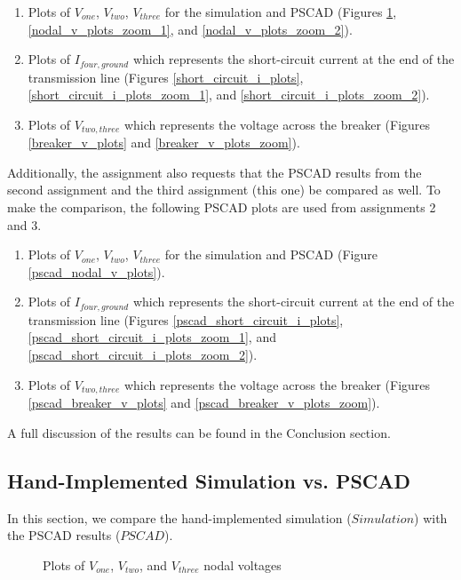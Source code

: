 \documentclass[10pt, oneside, letterpaper]{article}
\begin{document}
\begin{enumerate}[label=\alph*)]
  \item Plots of $V_{one}$, $V_{two}$, $V_{three}$ for the simulation and PSCAD (Figures \ref{nodal_v_plots}, \ref{nodal_v_plots_zoom_1}, and \ref{nodal_v_plots_zoom_2}).
  \item Plots of $I_{four, ground}$ which represents the short-circuit current at the end of the transmission line (Figures \ref{short_circuit_i_plots}, \ref{short_circuit_i_plots_zoom_1}, and \ref{short_circuit_i_plots_zoom_2}).
  \item Plots of $V_{two, three}$ which represents the voltage across the breaker (Figures \ref{breaker_v_plots} and \ref{breaker_v_plots_zoom}).
\end{enumerate}

Additionally, the assignment also requests that the PSCAD results from the second assignment and the third assignment (this one) be compared as well. To make the comparison, the following PSCAD plots are used from assignments 2 and 3.

\begin{enumerate}[label=\alph*)]
  \item Plots of $V_{one}$, $V_{two}$, $V_{three}$ for the simulation and PSCAD (Figure \ref{pscad_nodal_v_plots}).
  \item Plots of $I_{four, ground}$ which represents the short-circuit current at the end of the transmission line (Figures \ref{pscad_short_circuit_i_plots}, \ref{pscad_short_circuit_i_plots_zoom_1}, and \ref{pscad_short_circuit_i_plots_zoom_2}).
  \item Plots of $V_{two, three}$ which represents the voltage across the breaker (Figures \ref{pscad_breaker_v_plots} and \ref{pscad_breaker_v_plots_zoom}).
\end{enumerate}

A full discussion of the results can be found in the Conclusion section.

\subsection{Hand-Implemented Simulation vs. PSCAD}

In this section, we compare the hand-implemented simulation ($Simulation$) with the PSCAD results ($PSCAD$).

\begin{figure}[H]
    \begin{center}
        
    \end{center}
    \caption{Plots of $V_{one}$, $V_{two}$, and $V_{three}$ nodal voltages}
    \label{nodal_v_plots}
\end{figure}
\end{document}
